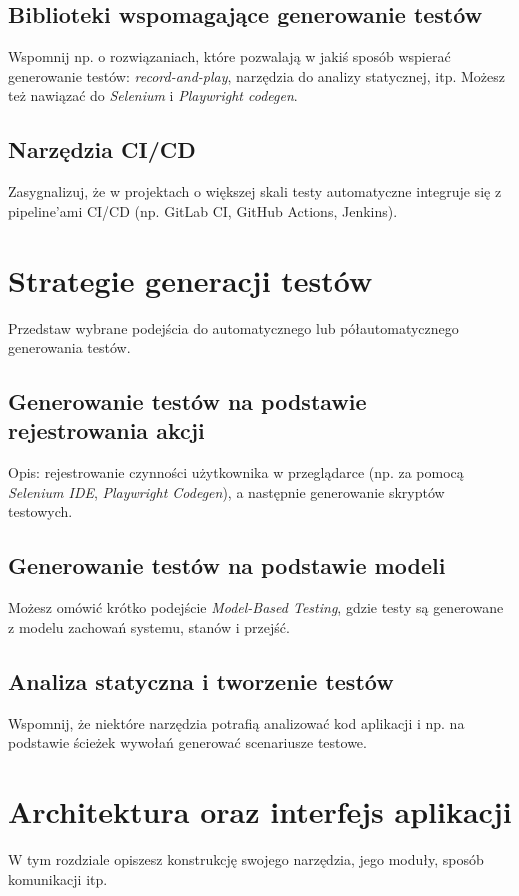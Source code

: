 \documentclass[12pt]{report}
\begin{document}
\section{Biblioteki wspomagające generowanie testów}
{Wspomnij np. o rozwiązaniach, które pozwalają w jakiś sposób wspierać generowanie testów: \emph{record-and-play}, narzędzia do analizy statycznej, itp. Możesz też nawiązać do \emph{Selenium} i \emph{Playwright codegen}.}

\section{Narzędzia CI/CD}
{Zasygnalizuj, że w projektach o większej skali testy automatyczne integruje się z pipeline’ami CI/CD (np. GitLab CI, GitHub Actions, Jenkins).}


\chapter{Strategie generacji testów}
{Przedstaw wybrane podejścia do automatycznego lub półautomatycznego generowania testów.}

\section{Generowanie testów na podstawie rejestrowania akcji}
{Opis: rejestrowanie czynności użytkownika w przeglądarce (np. za pomocą \emph{Selenium IDE}, \emph{Playwright Codegen}), a następnie generowanie skryptów testowych.}

\section{Generowanie testów na podstawie modeli}
{Możesz omówić krótko podejście \emph{Model-Based Testing}, gdzie testy są generowane z modelu zachowań systemu, stanów i przejść.}

\section{Analiza statyczna i tworzenie testów}
{Wspomnij, że niektóre narzędzia potrafią analizować kod aplikacji i np. na podstawie ścieżek wywołań generować scenariusze testowe.}


\chapter{Architektura oraz interfejs aplikacji}
{W tym rozdziale opiszesz konstrukcję swojego narzędzia, jego moduły, sposób komunikacji itp.}
\end{document}
